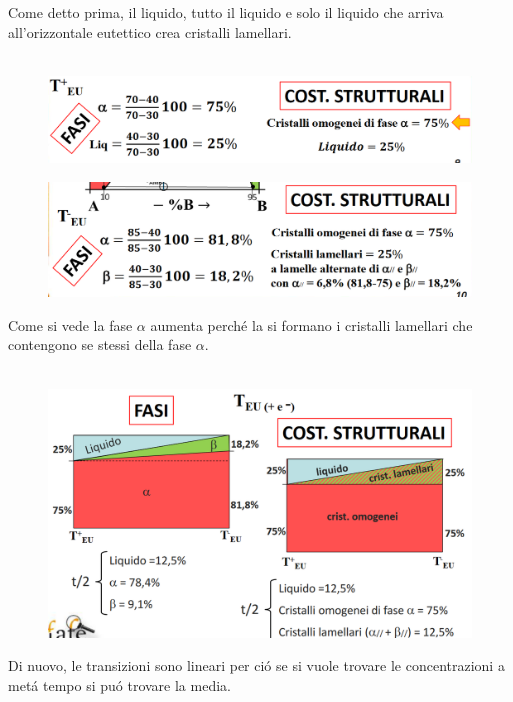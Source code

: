 \documentclass{article}
\begin{document}
{\begin{figure}[h!]
            \end{figure}
            \newpage
            Come detto prima, il liquido, tutto il liquido e solo il liquido che arriva all'orizzontale eutettico crea cristalli lamellari.\\ \\
            \begin{figure}[h!]
                \centering
                \includegraphics[width=.85\linewidth]{Calcolo per la lega ipoeutettica fuori dal campo prima di TEU.png}
            \end{figure}
            \begin{figure}[h!]
                \centering
                \includegraphics[width=.85\linewidth]{Calcolo per la lega ipoeutettica fuori dal campo dopo TEU.png}
            \end{figure}
            Come si vede la fase $\alpha$ aumenta perch\'e la si formano i cristalli lamellari che contengono se stessi della fase $\alpha$.\\ \\
            \begin{figure}[h!]
                \centering
                \includegraphics[width=.8\linewidth]{Calcolo per lega ipoeutettica fuori dal campo a meta tempo di arresto.png}
            \end{figure}
            Di nuovo, le transizioni sono lineari per ci\'o se si vuole trovare le concentrazioni a met\'a tempo si pu\'o trovare la media.\\ \\
}
\end{document}
